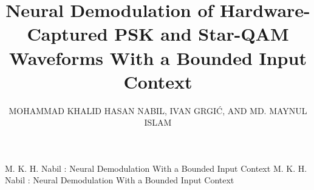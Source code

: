 \documentclass{ieeeaccess}
\begin{document}

\title{Neural Demodulation of Hardware-Captured PSK and Star-QAM Waveforms
With a Bounded Input Context}

\author{\uppercase{Mohammad Khalid Hasan Nabil},
\uppercase{Ivan Grgi\'{c}},
AND \uppercase{Md. Maynul Islam}}

\address[1]{Department of Information and Communication Technology, Bangladesh
University of Professionals, Dhaka 1216, Bangladesh (e-mail:
nabil23549009015@student.bup.edu.bd; maynul.mist@gmail.com)}

\address[2]{Mechanical Engineering Faculty in Slavonski Brod, University of
Slavonski Brod, 35000 Slavonski Brod, Croatia (e-mail: igrgic@unisb.hr)}


\markboth
{M. K. H. Nabil \headeretal: Neural Demodulation With a Bounded Input Context}
{M. K. H. Nabil \headeretal: Neural Demodulation With a Bounded Input Context}

\end{document}
